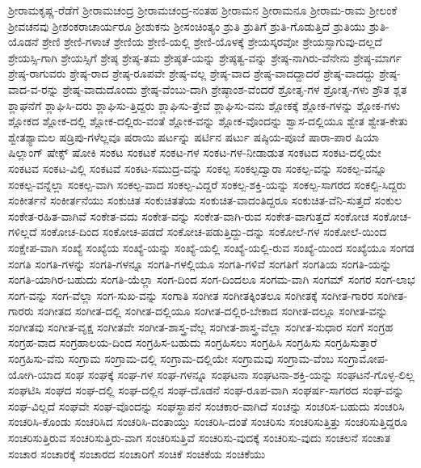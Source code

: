 {ಶ್ರೀರಾಮಕೃಷ್ಣ-ರೆಡೆಗೆ
ಶ್ರೀರಾಮಚಂದ್ರ
ಶ್ರೀರಾಮಚಂದ್ರ-ನಂತಹ
ಶ್ರೀರಾಮನ
ಶ್ರೀರಾಮನೂ
ಶ್ರೀರಾಮ-ರಾಮ
ಶ್ರೀಲಂಕೆ
ಶ್ರೀವಚನವು
ಶ್ರೀಶಂಕರಾಚಾರ್ಯರೂ
ಶ್ರೀಶುಕನು
ಶ್ರೀಸಂಚಿಂತ್ಯಂ
ಶ್ರುತಿ
ಶ್ರುತಿಗೆ
ಶ್ರುತಿ-ಗೊಡುತ್ತಿದೆ
ಶ್ರುತಿಯು
ಶ್ರುತಿ-ಯೊಡನೆ
ಶ್ರೇಣಿ
ಶ್ರೇಣಿ-ಗಳಾಚೆ
ಶ್ರೇಣಿಯ
ಶ್ರೇಣಿ-ಯಲ್ಲಿ
ಶ್ರೇಣಿ-ಯೊಳಕ್ಕೆ
ಶ್ರೇಯಸ್ಕರವೋ
ಶ್ರೇಯಸ್ಸಾಗುವು-ದಲ್ಲದೆ
ಶ್ರೇಯಸ್ಸಿ-ಗಾಗಿ
ಶ್ರೇಯಸ್ಸಿಗೆ
ಶ್ರೇಷ್ಠ
ಶ್ರೇಷ್ಠ-ತಮ
ಶ್ರೇಷ್ಠತೆ-ಯನ್ನು
ಶ್ರೇಷ್ಠತ್ವ-ವನ್ನು
ಶ್ರೇಷ್ಠ-ನಾಗಿರು-ವೆನೇನು
ಶ್ರೇಷ್ಠ-ಮಾರ್ಗ
ಶ್ರೇಷ್ಠ-ರಾಗುವರು
ಶ್ರೇಷ್ಠ-ರಾದ
ಶ್ರೇಷ್ಠ-ರೂಪವೇ
ಶ್ರೇಷ್ಠ-ವಲ್ಲ
ಶ್ರೇಷ್ಠ-ವಾದ
ಶ್ರೇಷ್ಠ-ವಾದದ್ದಾದರೆ
ಶ್ರೇಷ್ಠ-ವಾದದ್ದು
ಶ್ರೇಷ್ಠ-ವಾದ-ವ-ರನ್ನು
ಶ್ರೇಷ್ಠ-ವಾದುದೊಂದು
ಶ್ರೇಷ್ಠ-ವೆಂಬು-ದಾಗಿ
ಶ್ರೇಷ್ಠಾಂಶ-ವೆಂದರೆ
ಶ್ರೋತೃ-ಗಳ
ಶ್ರೋತೃ-ಗಳು
ಶ್ರೌತ
ಶ್ಲತ
ಶ್ಲಾಘನೆಗೆ
ಶ್ಲಾಘಿಸಿ-ದರು
ಶ್ಲಾಘಿಸು-ತ್ತಿದ್ದರು
ಶ್ಲಾಘಿಸು-ತ್ತೇವೆ
ಶ್ಲಾಘಿಸು-ವನು
ಶ್ಲೋಕಕ್ಕೆ
ಶ್ಲೋಕ-ಗಳನ್ನು
ಶ್ಲೋಕ-ಗಳು
ಶ್ಲೋಕದ
ಶ್ಲೋಕ-ದಲ್ಲಿ
ಶ್ಲೋಕ-ದಲ್ಲಿರು-ವಂತೆ
ಶ್ಲೋಕ-ವನ್ನು
ಶ್ಲೋಕ-ವೊಂದನ್ನು
ಶ್ವಾಸ-ದಲ್ಲಿಯೂ
ಶ್ವೇತ
ಶ್ವೇತ-ಕೇತು
ಶ್ವೇತಶ್ಯಾಮಲ
ಷಡ್ರಿಪು-ಗಳೆಲ್ಲವೂ
ಷರಾಯಿ
ಷರ್ಟನ್ನು
ಷರ್ಟಿನ
ಷರ್ಟು
ಷಷ್ಠಿಯ-ಪೂಜೆ
ಷಾರಾ-ಪಾರ
ಷಿಯಾ
ಷಿಲ್ಲಾಂಗ್
ಷೇಕ್ಸ್
ಷೋಕಿ
ಸಂಕಟ
ಸಂಕಟಕೆ
ಸಂಕಟ-ಗಳ
ಸಂಕಟ-ಗಳ-ನೀಡಾಡುತ
ಸಂಕಟದ
ಸಂಕಟ-ದಲ್ಲಿಯೇ
ಸಂಕಟವ
ಸಂಕಟ-ವಿಲ್ಲಿ
ಸಂಕಟವೆ
ಸಂಕಟ-ಸಮುದ್ರ-ವನ್ನು
ಸಂಕಲ್ಪ
ಸಂಕಲ್ಪದ್ವಾರಾ
ಸಂಕಲ್ಪ-ವನ್ನು
ಸಂಕಲ್ಪ-ವನ್ನೂ
ಸಂಕಲ್ಪ-ವನ್ನೆಲ್ಲಾ
ಸಂಕಲ್ಪ-ವಾಗಿ
ಸಂಕಲ್ಪ-ವಾದ
ಸಂಕಲ್ಪ-ವಿದ್ದರೆ
ಸಂಕಲ್ಪ-ಶಕ್ತಿ-ಯನ್ನು
ಸಂಕಲ್ಪ-ಸಾಗರದ
ಸಂಕಲ್ಪಿ-ಸಿದ್ದರು
ಸಂಕೀರ್ತನೆ
ಸಂಕೀರ್ತನೆಯು
ಸಂಕುಚಿತ
ಸಂಕುಚಿತತೆಯ
ಸಂಕುಚಿತ-ವಾದಂತಿದ್ದರೂ
ಸಂಕುಚಿತ-ವೆನಿ-ಸುತ್ತದೆ
ಸಂಕುಲ
ಸಂಕೇತ-ರಹಿತ-ವಾಗಿವೆ
ಸಂಕೇತ-ವದು
ಸಂಕೇತ-ವನ್ನು
ಸಂಕೇತ-ವಾಗಿ-ರುವ
ಸಂಕೇತ-ವಾಗುತ್ತದೆ
ಸಂಕೋಚ
ಸಂಕೋಚ-ಗಳಿಲ್ಲದೆ
ಸಂಕೋಚ-ದಿಂದ
ಸಂಕೋಚ-ಪಡದೆ
ಸಂಕೋಚ-ಪಡುತ್ತಿದ್ದು-ದನ್ನು
ಸಂಕೋಲೆ-ಗಳ
ಸಂಕೋಲೆ-ಯಿಂದ
ಸಂಕ್ಷೇಪ-ವಾಗಿ
ಸಂಖ್ಯೆ
ಸಂಖ್ಯೆಯ
ಸಂಖ್ಯೆ-ಯನ್ನು
ಸಂಖ್ಯೆ-ಯಲ್ಲಿ
ಸಂಖ್ಯೆ-ಯಲ್ಲಿ-ರುವ
ಸಂಖ್ಯೆ-ಯಿಂದ
ಸಂಖ್ಯೆಯೂ
ಸಂಗಡ
ಸಂಗತಿ
ಸಂಗತಿ-ಗಳನ್ನು
ಸಂಗತಿ-ಗಳನ್ನೂ
ಸಂಗತಿ-ಗಳಲ್ಲಿಯೂ
ಸಂಗತಿ-ಗಳಿವೆ
ಸಂಗತಿಗೆ
ಸಂಗತಿಯ
ಸಂಗತಿ-ಯನ್ನು
ಸಂಗತಿ-ಯಾಗಿರ-ಬಹುದು
ಸಂಗತಿ-ಯೆಲ್ಲಾ
ಸಂಗ-ದಿಂದ
ಸಂಗ-ದಿಂದಲೂ
ಸಂಗಮ-ವಾಗಿ
ಸಂಗಮ್
ಸಂಗರ
ಸಂಗ-ಲಾಭ
ಸಂಗ-ವನ್ನು
ಸಂಗ-ವೆಲ್ಲಾ
ಸಂಗ-ಸುಖ-ವನ್ನು
ಸಂಗಾತಿ
ಸಂಗೀತ
ಸಂಗೀತಕ್ಕಿಂತಲೂ
ಸಂಗೀತಕ್ಕೆ
ಸಂಗೀತ-ಗಾರರ
ಸಂಗೀತ-ಗಾರರು
ಸಂಗೀತದ
ಸಂಗೀತ-ದಲ್ಲಿ
ಸಂಗೀತ-ದಲ್ಲಿಯೂ
ಸಂಗೀತ-ದಲ್ಲಿರ-ಬೇಕಾದ
ಸಂಗೀತ-ದಲ್ಲೂ
ಸಂಗೀತ-ವನ್ನು
ಸಂಗೀತವು
ಸಂಗೀತ-ವೃಕ್ಷ
ಸಂಗೀತವೇ
ಸಂಗೀತ-ಶಾಸ್ತ್ರ-ವೆಲ್ಲ
ಸಂಗೀತ-ಶಾಸ್ತ್ರ-ವೆಲ್ಲಾ
ಸಂಗೀತ-ಸುಧಾರ
ಸಂಗೆ
ಸಂಗ್ರಹ
ಸಂಗ್ರಹ-ವಾದ
ಸಂಗ್ರಹಾಲಯ-ದಿಂದ
ಸಂಗ್ರಹಿಸ-ಬಹುದು
ಸಂಗ್ರಹಿಸಲು
ಸಂಗ್ರಹಿಸಿ
ಸಂಗ್ರಹಿಸು
ಸಂಗ್ರಹಿಸುತ್ತಾರೆ
ಸಂಗ್ರಹಿಸು-ವೆನು
ಸಂಗ್ರಾಮ
ಸಂಗ್ರಾಮ-ದಲ್ಲಿ
ಸಂಗ್ರಾಮ-ದಲ್ಲಿಯೇ
ಸಂಗ್ರಾಮವು
ಸಂಗ್ರಾಮ-ವೆಂಬ
ಸಂಗ್ರಾಮೋಪ-ಯೋಗಿ-ಯಾದ
ಸಂಘ
ಸಂಘಕ್ಕೆ
ಸಂಘ-ಗಳ
ಸಂಘ-ಗಳನ್ನೂ
ಸಂಘಟನಾ
ಸಂಘಟನಾ-ಶಕ್ತಿ-ಯನ್ನು
ಸಂಘಟನೆ-ಗೊಳ್ಳ-ಲಿಲ್ಲ
ಸಂಘಟಿಸಿ
ಸಂಘದ
ಸಂಘ-ದಲ್ಲಿ
ಸಂಘ-ದಲ್ಲಿನ
ಸಂಘ-ದೊಡನೆ
ಸಂಘ-ರೂಪ-ವಾಗಿ
ಸಂಘರ್ಷ-ಸಾಗರದ
ಸಂಘ-ವನ್ನು
ಸಂಘ-ವಿಲ್ಲದೆ
ಸಂಘವೇ
ಸಂಘ-ವೊಂದನ್ನು
ಸಂಘಸ್ಥಾಪನೆ
ಸಂಚಕಾರ-ವಾಗಿದೆ
ಸಂಚನ್ನು
ಸಂಚರಿಸ-ಬಹುದು
ಸಂಚರಿಸಿ
ಸಂಚರಿಸಿ-ಕೊಂಡು
ಸಂಚರಿಸಿದ
ಸಂಚರಿಸಿ-ದಂತಾಯ್ತು
ಸಂಚರಿಸಿ-ದಂತೆ
ಸಂಚರಿಸು
ಸಂಚರಿಸುತ್ತಿತ್ತು
ಸಂಚರಿಸುತ್ತಿದ್ದರೂ
ಸಂಚರಿಸುತ್ತಿರುವ
ಸಂಚರಿಸುತ್ತಿರು-ವಾಗ
ಸಂಚರಿಸುತ್ತಿವೆ
ಸಂಚರಿಸು-ವುದಕ್ಕೆ
ಸಂಚರಿಸು-ವುದು
ಸಂಚಲನೆ
ಸಂಚಾತ
ಸಂಚಾರ
ಸಂಚಾರಕ್ಕೆ
ಸಂಚಾರದ
ಸಂಚಾರಿಗೆ
ಸಂಚಿಕೆ
ಸಂಚಿಕೆಯ
ಸಂಚಿಕೆಯು
}
